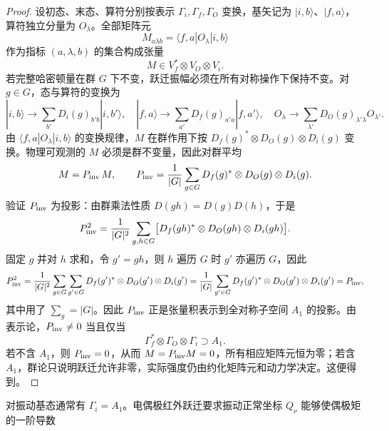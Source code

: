 \begin{proof}
设初态、末态、算符分别按表示 $\Gamma_i,\Gamma_f,\Gamma_O$ 变换，基矢记为 $|i,b\rangle$、$|f,a\rangle$，算符独立分量为 $O_\lambda$。全部矩阵元
\begin{equation*}
M_{a\lambda b}=\langle f,a|O_\lambda|i,b\rangle
\end{equation*}
作为指标 $(a,\lambda,b)$ 的集合构成张量
\begin{equation*}
M\in V_f^*\otimes V_O\otimes V_i.
\end{equation*}
若完整哈密顿量在群 $G$ 下不变，跃迁振幅必须在所有对称操作下保持不变。对 $g\in G$，态与算符的变换为
\begin{equation*}
|i,b\rangle\to\sum_{b'}D_i(g)_{b'b}|i,b'\rangle,
\quad
|f,a\rangle\to\sum_{a'}D_f(g)_{a'a}|f,a'\rangle,
\quad
O_\lambda\to\sum_{\lambda'}D_O(g)_{\lambda'\lambda}O_{\lambda'}.
\end{equation*}
由 $\langle f,a|O_\lambda|i,b\rangle$ 的变换规律，$M$ 在群作用下按 $D_f(g)^*\otimes D_O(g)\otimes D_i(g)$ 变换。物理可观测的 $M$ 必须是群不变量，因此对群平均
\begin{equation*}
M = P_{\rm inv}\,M,
\qquad
P_{\rm inv}
= \frac1{|G|}\sum_{g\in G}
 D_f(g)^*\otimes D_O(g)\otimes D_i(g).
\end{equation*}
验证 $P_{\rm inv}$ 为投影：由群乘法性质 $D(gh)=D(g)D(h)$，于是
\begin{equation*}
P_{\rm inv}^2
= \frac1{|G|^2}\sum_{g,h\in G}
 \bigl[D_f(gh)^*\otimes D_O(gh)\otimes D_i(gh)\bigr].
\end{equation*}
固定 $g$ 并对 $h$ 求和，令 $g'=gh$，则 $h$ 遍历 $G$ 时 $g'$ 亦遍历 $G$，因此
\begin{equation*}
P_{\rm inv}^2
= \frac1{|G|^2}\sum_{g\in G}\sum_{g'\in G}
 D_f(g')^*\otimes D_O(g')\otimes D_i(g')
= \frac1{|G|}\sum_{g'\in G}D_f(g')^*\otimes D_O(g')\otimes D_i(g')
= P_{\rm inv},
\end{equation*}
其中用了 $\sum_g=|G|$。因此 $P_{\rm inv}$ 正是张量积表示到全对称子空间 $A_1$ 的投影。由表示论，$P_{\rm inv}\ne0$ 当且仅当
\begin{equation*}
\Gamma_f^*\otimes\Gamma_O\otimes\Gamma_i\supset A_1.
\end{equation*}
若不含 $A_1$，则 $P_{\rm inv}=0$，从而 $M=P_{\rm inv}M=0$，所有相应矩阵元恒为零；若含 $A_1$，群论只说明跃迁允许非零，实际强度仍由约化矩阵元和动力学决定。这便得到。
\end{proof}

对振动基态通常有 \(\Gamma_i=A_1\)。电偶极红外跃迁要求振动正常坐标 \(Q_\nu\) 能够使偶极矩的一阶导数

